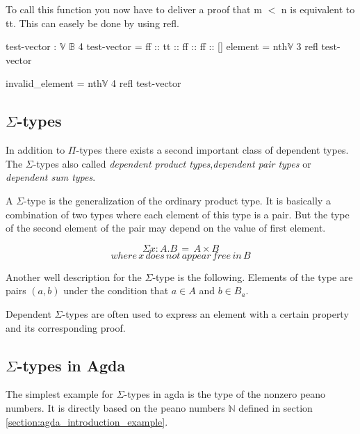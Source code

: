 To call this function you now have to deliver a proof that m $<$ n is equivalent to tt. This can easely be done by using refl. 
\begin{codesnippet}[mathescape=true, caption={Usage of \emph{nth} function in Agda}, label={codeSnippet:vector_nth_usage}]
test-vector : $\mathbb{V}$ $\mathbb{B}$ 4
test-vector = ff :: tt :: ff :: ff :: []
element = nth$\mathbb{V}$ 3 refl test-vector

invalid_element = nth$\mathbb{V}$ 4 refl test-vector
\end{codesnippet}


\subsection{$\Sigma$-types}
In addition to $\Pi$-types there exists a second important class of dependent types. 
The $\Sigma$-types also called \emph{dependent product types}\cite{10.1145/2841316},\emph{dependent pair types}\cite{10.1145/2841316} or \emph{dependent sum types}\cite{10.5555/1076265}.

A $\Sigma$-type is the generalization of the ordinary product type. 
It is basically a combination of two types where each element of this type is a pair. 
But the type of the second element of the pair may depend on the value of first element.

$$\Sigma x: A.B \,= \, A \times B$$
$$where \, x \, does \, not \, appear \, free \, in \, B$$


Another well description for the $\Sigma$-type is the following. 
Elements of the type are pairs $(a, b)$ under the condition that $a \in A$ and $b \in B_a$.

Dependent $\Sigma$-types are often used to express an element with a certain property and its corresponding proof.

\subsection{$\Sigma$-types in Agda}
The simplest example for $\Sigma$-types in agda is the type of the nonzero peano numbers.
It is directly based on the peano numbers $\mathbb{N}$ defined in section \ref{section:agda_introduction_example}.

